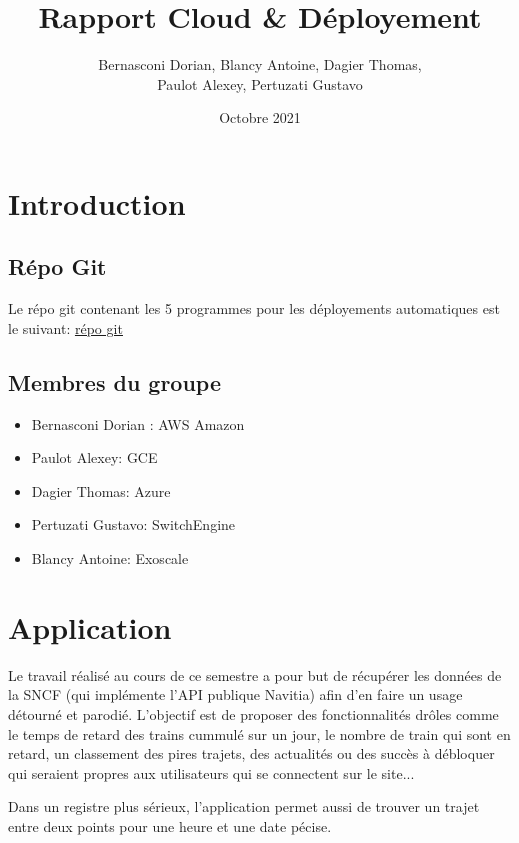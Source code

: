 \documentclass{article}
\title{Rapport Cloud & Déployement}
\author{Bernasconi Dorian, Blancy Antoine,  Dagier Thomas, 
        \\ Paulot Alexey, Pertuzati Gustavo }
\date{Octobre 2021}
\begin{document}
\maketitle

\tableofcontents

\section{Introduction}
\subsection{Répo Git}
Le répo git contenant les 5 programmes pour les déployements automatiques est le suivant:
\underline{\href{https://githepia.hesge.ch/dorian.bernasco/cloud_deployment}{répo git}}

\subsection{Membres du groupe}
\begin{itemize}
    \setlength\itemsep{-0.7em}
    \item Bernasconi Dorian : AWS Amazon \\
    \item Paulot Alexey: GCE \\
    \item Dagier Thomas: Azure \\
    \item Pertuzati Gustavo: SwitchEngine \\
    \item Blancy Antoine: Exoscale 
\end{itemize}

\section{Application}


Le travail réalisé au cours de ce semestre a pour but de récupérer les données de la SNCF (qui implémente l'API publique Navitia) afin d'en faire un usage détourné et parodié. 
L'objectif est de proposer des fonctionnalités drôles comme le temps de retard des trains cummulé sur un jour, le nombre de train qui sont en retard, 
un classement des pires trajets, des actualités ou des succès à débloquer qui seraient propres aux utilisateurs qui se connectent sur le site...

Dans un registre plus sérieux, l'application permet aussi de trouver un trajet entre deux points pour une heure et une date pécise.
\end{document}
